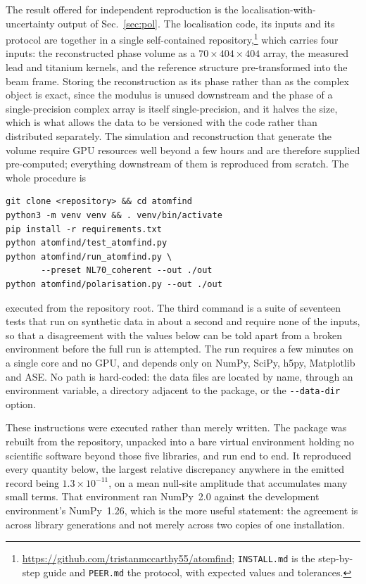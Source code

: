 \documentclass[aps,prb,twocolumn,superscriptaddress,floatfix,nofootinbib]{revtex4-2}
\begin{document}
The result offered for independent reproduction is the localisation-with-uncertainty output of
Sec.~\ref{sec:pol}. The localisation code, its inputs and its protocol are together in a single
self-contained repository,\footnote{\url{https://github.com/tristanmccarthy55/atomfind};
\texttt{INSTALL.md} is the step-by-step guide and \texttt{PEER.md} the protocol, with expected
values and tolerances.} which carries four inputs: the reconstructed phase volume as a
$70\times404\times404$ array, the measured lead and titanium kernels, and the reference
structure pre-transformed into the beam frame. Storing the reconstruction as its phase rather
than as the complex object is exact, since the modulus is unused downstream and the phase of a
single-precision complex array is itself single-precision, and it halves the size, which is what
allows the data to be versioned with the code rather than distributed separately.
The simulation and reconstruction that generate the volume require GPU resources well beyond a
few hours and are therefore supplied pre-computed; everything downstream of them is reproduced
from scratch. The whole procedure is
{\footnotesize\begin{verbatim}
git clone <repository> && cd atomfind
python3 -m venv venv && . venv/bin/activate
pip install -r requirements.txt
python atomfind/test_atomfind.py
python atomfind/run_atomfind.py \
       --preset NL70_coherent --out ./out
python atomfind/polarisation.py --out ./out
\end{verbatim}}
executed from the repository root. The third command is a suite of seventeen tests that run on
synthetic data in about a second and require none of the inputs, so that a disagreement with the
values below can be told apart from a broken environment before the full run is attempted. The run requires a few minutes on a
single core and no GPU, and depends only on NumPy, SciPy, h5py, Matplotlib and ASE. No path is
hard-coded: the data files are located by name, through an environment variable, a directory
adjacent to the package, or the \texttt{-{}-data-dir} option.

These instructions were executed rather than merely written. The package was rebuilt from the
repository, unpacked into a bare virtual environment holding no scientific software beyond those
five libraries, and run end to end. It reproduced every quantity below, the largest relative
discrepancy anywhere in the emitted record being $1.3\times10^{-11}$, on a mean null-site
amplitude that accumulates many small terms. That environment ran NumPy~2.0 against the
development environment's NumPy~1.26, which is the more useful statement: the agreement is
across library generations and not merely across two copies of one installation.
\end{document}
